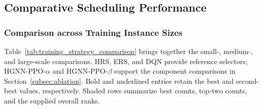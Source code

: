 \subsection{Comparative Scheduling Performance}
\label{subsec:result_analysis}
\subsubsection{Comparison across Training Instance Sizes}
\label{subsec:comparative_results}

Table~\ref{tab:training_strategy_comparison} brings together the small-, medium-, and large-scale comparisons.
HRS, ERS, and DQN provide reference selectors; HGNN-PPO-$\alpha$ and HGNN-PPO-$\beta$ support
the component comparisons in Section~\ref{subsec:ablation}. Bold and underlined entries retain the best
and second-best values, respectively. Shaded rows summarize best counts, top-two counts, and the supplied overall ranks.

